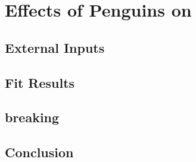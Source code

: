 
\chapter{Effects of Penguins on \phis}
\label{Penguins}

\section{External Inputs}

\section{Fit Results}
\label{penguin_shifts}


\section{\grpsuthree breaking}

\section{Conclusion}

